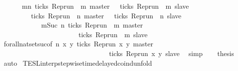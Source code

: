 \begin{isabellebody}
%
\isadelimproof
%
\endisadelimproof
%
\isatagproof
{}\isamarkupfalse%
\ {\isacharminus}\isanewline
\ \ \isamarkupfalse%
\ {\isacartoucheopen}{\isacharbraceleft}{\isasymrho}{\isachardot}\ {\isasymforall}m{\isasymge}n{\isachardot}\ ticks\ {\isacharparenleft}{\isacharparenleft}Rep{\isacharunderscore}run\ {\isasymrho}{\isacharparenright}\ m\ master{\isacharparenright}\ {\isasymlongrightarrow}\ {\isasymnot}\ ticks\ {\isacharparenleft}{\isacharparenleft}Rep{\isacharunderscore}run\ {\isasymrho}{\isacharparenright}\ m\ slave{\isacharparenright}{\isacharbraceright}\isanewline
\ \ \ \ \ \ \ {\isacharequal}\ {\isacharbraceleft}{\isasymrho}{\isachardot}\ ticks\ {\isacharparenleft}{\isacharparenleft}Rep{\isacharunderscore}run\ {\isasymrho}{\isacharparenright}\ n\ master{\isacharparenright}\ {\isasymlongrightarrow}\ {\isasymnot}\ ticks\ {\isacharparenleft}{\isacharparenleft}Rep{\isacharunderscore}run\ {\isasymrho}{\isacharparenright}\ n\ slave{\isacharparenright}{\isacharbraceright}\isanewline
\ \ \ \ \ \ \ \ \ \ {\isasyminter}\ {\isacharbraceleft}{\isasymrho}{\isachardot}\ {\isasymforall}m{\isasymge}Suc\ n{\isachardot}\ ticks\ {\isacharparenleft}{\isacharparenleft}Rep{\isacharunderscore}run\ {\isasymrho}{\isacharparenright}\ m\ master{\isacharparenright}\isanewline
\ \ \ \ \ \ \ \ \ \ \ \ \ \ \ \ \ \ \ \ \ {\isasymlongrightarrow}\ {\isasymnot}\ ticks\ {\isacharparenleft}{\isacharparenleft}Rep{\isacharunderscore}run\ {\isasymrho}{\isacharparenright}\ m\ slave{\isacharparenright}{\isacharbraceright}{\isacartoucheclose}\isanewline
\ \ \ \ \isamarkupfalse%
\ forall{\isacharunderscore}nat{\isacharunderscore}set{\isacharunderscore}suc{\isacharbrackleft}of\ {\isacartoucheopen}n{\isacartoucheclose}\ {\isacartoucheopen}{\isasymlambda}x\ y{\isachardot}\ ticks\ {\isacharparenleft}{\isacharparenleft}Rep{\isacharunderscore}run\ x{\isacharparenright}\ y\ master{\isacharparenright}\isanewline
\ \ \ \ \ \ \ \ \ \ \ \ \ \ \ \ \ \ \ \ \ \ \ \ \ \ \ \ \ \ \ {\isasymlongrightarrow}\ {\isasymnot}ticks\ {\isacharparenleft}{\isacharparenleft}Rep{\isacharunderscore}run\ x{\isacharparenright}\ y\ slave{\isacharparenright}{\isacartoucheclose}{\isacharbrackright}\ \isamarkupfalse%
\ simp\isanewline
\ \ \isamarkupfalse%
\ {\isacharquery}thesis\ \isamarkupfalse%
\ auto\isanewline
{}\isamarkupfalse%
%
\endisatagproof
{\isafoldproof}%
%
\isadelimproof
\isanewline
%
\endisadelimproof
\isanewline
{}\isamarkupfalse%
\ TESL{\isacharunderscore}interp{\isacharunderscore}stepwise{\isacharunderscore}timedelayed{\isacharunderscore}coind{\isacharunderscore}unfold{\isacharcolon}\isanewline

\end{isabellebody}
